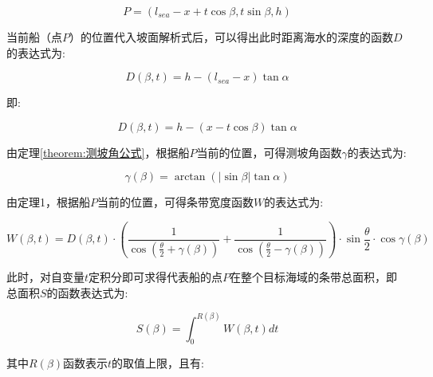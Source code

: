 \begin{equation}
    P = (l_{sea} - x + t\cos \beta,
    t\sin \beta,
    h)
\end{equation}

当前船（点$P$）的位置代入坡面解析式后，可以得出此时距离海水的深度的函数$D$的表达式为:

\begin{equation*}
    D(\beta, t) =
    h - \left(l_{sea} - x\right)\tan \alpha
\end{equation*}

即:

\begin{equation}
    D(\beta, t) =
    h - \left(x - t\cos \beta \right)\tan \alpha
\end{equation}

由定理\ref{theorem:测坡角公式}，根据船$P$当前的位置，可得测坡角函数$\gamma$的表达式为:

\begin{equation}
    \gamma(\beta) =
    \arctan \left(|\sin \beta| \tan \alpha\right)
\end{equation}

由定理1，根据船$P$当前的位置，可得条带宽度函数$W$的表达式为:

\begin{equation}
    W(\beta, t) =
    D(\beta, t)\cdot
    \left(
    \frac{1}{\cos (\frac{\theta}{2} + \gamma(\beta))} +
    \frac{1}{\cos (\frac{\theta}{2} - \gamma(\beta))}
    \right)\cdot
    \sin {\frac{\theta}{2}}\cdot \cos \gamma(\beta)
\end{equation}

此时，对自变量$t$定积分即可求得代表船的点$P$在整个目标海域的条带总面积，即总面积$S$的函数表达式为:

\begin{equation}
    S(\beta) =
    \int _{0} ^{R(\beta)} {
        W(\beta, t)dt
    }
\end{equation}

其中$R(\beta)$函数表示$t$的取值上限，且有:


